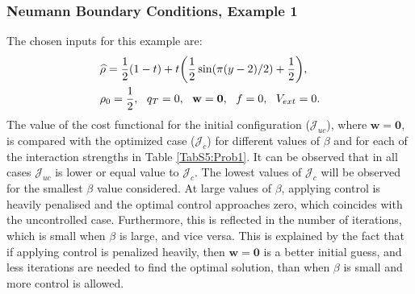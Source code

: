 \subsubsection{Neumann Boundary Conditions, Example 1}	 
The chosen inputs for this example are:
\begin{align*}
&\widehat \rho = \frac{1}{2}(1-t) + t\bigg(\frac{1}{2}\sin(\pi (y - 2)/2) + \frac{1}{2}\bigg),\\
&\rho_{0} = \frac{1}{2}, \ \
\adj_{T} = 0, \ \
\mathbf{w} = \mathbf{0}, \ \ 
f =0,\ \
V_{ext} =0.
\end{align*}	
The value of the cost functional for the initial configuration ($\mathcal{J}_{uc}$), where $\mathbf{w} =\mathbf{0}$, is compared with the optimized case ($\mathcal{J}_c$) for different values of $\beta$ and for each of the interaction strengths in Table \ref{TabS5:Prob1}. It can be observed that in all cases $\mathcal{J}_{uc}$ is lower or equal value to $\mathcal{J}_c$. The lowest values of $\mathcal{J}_{c}$ will be observed for the smallest $\beta$ value considered. At large values of $\beta$, applying control is heavily penalised and the optimal control approaches zero, which coincides with the uncontrolled case. Furthermore, this is reflected in the number of iterations, which is small when $\beta$ is large, and vice versa. This is explained by the fact that if applying control is penalized heavily, then $\mathbf{w} = \mathbf 0$ is a better initial guess, and less iterations are needed to find the optimal solution, than when $\beta$ is small and more control is allowed.

